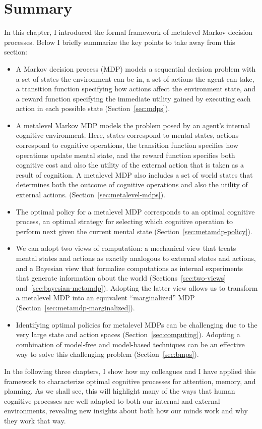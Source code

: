 \section{Summary}

In this chapter, I introduced the formal framework of metalevel Markov decision processes. Below I briefly summarize the key points to take away from this section:

\begin{itemize}
  \item A Markov decision process (MDP) models a sequential decision problem with a set of states the environment can be in, a set of actions the agent can take, a transition function specifying how actions affect the environment state, and a reward function specifying the immediate utility gained by executing each action in each possible state (Section~\ref{sec:mdps}).

  \item A metalevel Markov MDP models the problem posed by an agent's internal cognitive environment. Here, states correspond to mental states, actions correspond to cognitive operations, the transition function specifies how operations update mental state, and the reward function specifies both cognitive cost and also the utility of the external action that is taken as a result of cognition. A metalevel MDP also includes a set of world states  that determines both the outcome of cognitive operations and also the utility of external actions. (Section~\ref{sec:metalevel-mdps}).

  \item The optimal policy for a metalevel MDP corresponds to an optimal cognitive process, an optimal strategy for selecting which cognitive operation to perform next given the current mental state (Section~\ref{sec:metamdp-policy}).

  \item We can adopt two views of computation: a mechanical view that treats mental states and actions as exactly analogous to external states and actions, and a Bayesian view that formalize computations as internal experiments that generate information about the world (Sections~\ref{sec:two-views} and~\ref{sec:bayesian-metamdp}). Adopting the latter view allows us to transform a metalevel MDP into an equivalent ``marginalized'' MDP (Section~\ref{sec:metamdp-marginalized}).

  \item Identifying optimal policies for metalevel MDPs can be challenging due to the very large state and action spaces (Section~\ref{sec:computing}). Adopting a combination of model-free and model-based techniques can be an effective way to solve this challenging problem (Section~\ref{sec:bmps}).
\end{itemize}

In the following three chapters, I show how my colleagues and I have applied this framework to characterize optimal cognitive processes for attention, memory, and planning. As we shall see, this will highlight many of the ways that human cognitive processes are well adapted to both our internal and external environments, revealing new insights about both how our minds work and why they work that way.

